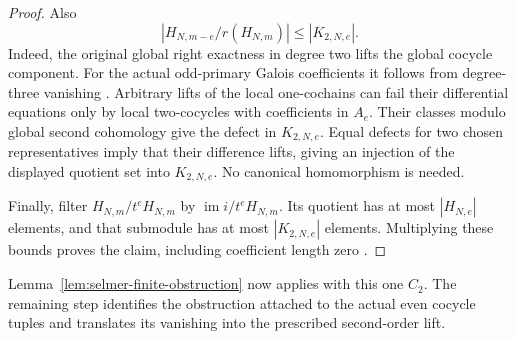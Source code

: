 \begin{proof}
Also
\[
 |H_{N,m-e}/r(H_{N,m})|\leq |K_{2,N,e}|.
\]
Indeed, the original global right exactness in degree two lifts
the global cocycle component. For the actual odd-primary Galois
coefficients it follows from degree-three vanishing
\cite[I, Theorem 4.10(c)]{milne-adt}. Arbitrary lifts of the local
one-cochains can fail their differential equations only by local
two-cocycles with coefficients in $A_e$. Their classes modulo
global second cohomology give the defect in $K_{2,N,e}$. Equal
defects for two chosen representatives imply that their difference
lifts, giving an injection of the displayed quotient set into
$K_{2,N,e}$. No canonical homomorphism is needed.

Finally, filter $H_{N,m}/t^eH_{N,m}$ by
$\operatorname{im}i/t^eH_{N,m}$. Its quotient has at most
$|H_{N,e}|$ elements, and that submodule has at most
$|K_{2,N,e}|$ elements. Multiplying these bounds proves the
claim, including coefficient length zero
\cite{alpo-obstruction-quotients}.
\end{proof}

Lemma~\ref{lem:selmer-finite-obstruction} now applies with this
one $C_2$. The remaining step identifies the obstruction attached
to the actual even cocycle tuples and translates its vanishing
into the prescribed second-order lift.

